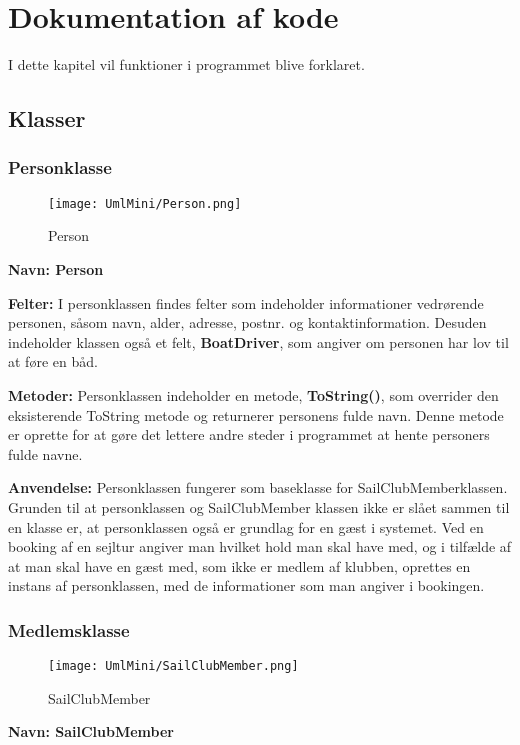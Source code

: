\chapter{Dokumentation af kode} \label{chap:kode_docs}
I dette kapitel vil funktioner i programmet blive forklaret.

\section{Klasser}
\subsection*{Personklasse}
\begin{wrapfigure}[8]{R}{0.4\textwidth}
    \label{img:Person}
    \vspace{-30pt}
    \begin{center}
        \texttt{[image: UmlMini/Person.png]}
    \end{center}
    \vspace{-20pt}
    \caption{Person}
    \vspace{-10pt}
\end{wrapfigure}
\textbf{Navn: Person}

\textbf{Felter:}
I personklassen findes felter som indeholder informationer vedrørende personen, såsom navn, alder, adresse, postnr. og kontaktinformation. 
Desuden indeholder klassen også et felt, \textbf{BoatDriver}, som angiver om personen har lov til at føre en båd. 

\textbf{Metoder:}
Personklassen indeholder en metode, \textbf{ToString()}, som overrider den eksisterende ToString metode og returnerer personens fulde navn. 
Denne metode er oprette for at gøre det lettere andre steder i programmet at hente personers fulde navne.

\textbf{Anvendelse:}
Personklassen fungerer som baseklasse for SailClubMemberklassen. Grunden til at personklassen og SailClubMember klassen ikke er slået sammen til en klasse er, at personklassen også er grundlag for en gæst i systemet. 
Ved en booking af en sejltur angiver man hvilket hold man skal have med, og i tilfælde af at man skal have en gæst med, som ikke er medlem af klubben, oprettes en instans af personklassen, med de informationer som man angiver i bookingen.

\subsection*{Medlemsklasse}
\begin{wrapfigure}[6]{R}{0.5\textwidth}
    \label{img:SailClubMember}
    \vspace{-30pt}
    \begin{center}
        \texttt{[image: UmlMini/SailClubMember.png]}
    \end{center}
    \vspace{-20pt}
    \caption{SailClubMember}
\end{wrapfigure}
\textbf{Navn: SailClubMember}

